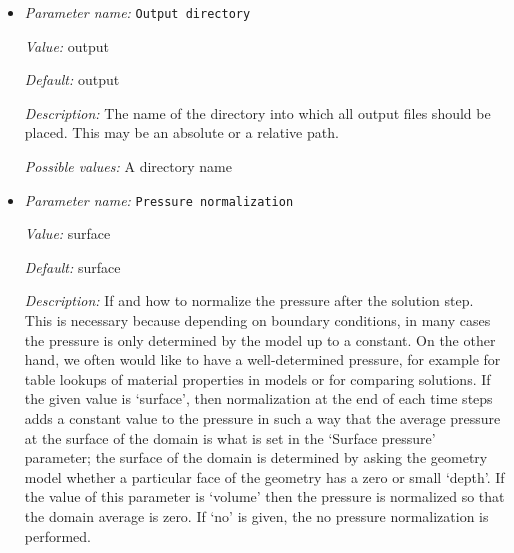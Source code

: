 \begin{itemize}
{\it Description:} As explained in the paper that describes ASPECT (Kronbichler, Heister, and Bangerth, 2012, see \cite{KHB12}) we first try to solve the Stokes system in every time step using a GMRES iteration with a poor but cheap preconditioner. By default, we try whether we can converge the GMRES solver in 200 such iterations before deciding that we need a better preconditioner. This is sufficient for simple problems with variable viscosity and we never need the second phase with the more expensive preconditioner. On the other hand, for more complex problems, and in particular for problems with strongly nonlinear viscosity, the 200 cheap iterations don't actually do very much good and one might skip this part right away. In that case, this parameter can be set to zero, i.e., we immediately start with the better but more expensive preconditioner.


{\it Possible values:} An integer $n$ such that $0\leq n \leq 2147483647$
\item {\it Parameter name:} {\tt Output directory}
\label{parameters:Output directory}


{\it Value:} output


{\it Default:} output


{\it Description:} The name of the directory into which all output files should be placed. This may be an absolute or a relative path.


{\it Possible values:} A directory name
\item {\it Parameter name:} {\tt Pressure normalization}
\label{parameters:Pressure normalization}


{\it Value:} surface


{\it Default:} surface


{\it Description:} If and how to normalize the pressure after the solution step. This is necessary because depending on boundary conditions, in many cases the pressure is only determined by the model up to a constant. On the other hand, we often would like to have a well-determined pressure, for example for table lookups of material properties in models or for comparing solutions. If the given value is `surface', then normalization at the end of each time steps adds a constant value to the pressure in such a way that the average pressure at the surface of the domain is what is set in the `Surface pressure' parameter; the surface of the domain is determined by asking the geometry model whether a particular face of the geometry has a zero or small `depth'. If the value of this parameter is `volume' then the pressure is normalized so that the domain average is zero. If `no' is given, the no pressure normalization is performed.



\end{itemize}
